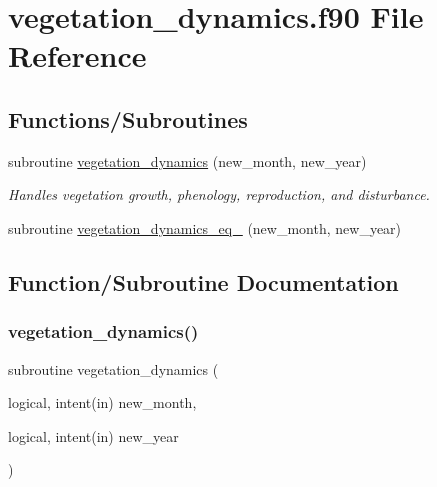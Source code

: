 \hypertarget{vegetation__dynamics_8f90}{}\section{vegetation\+\_\+dynamics.\+f90 File Reference}
\label{vegetation__dynamics_8f90}
\subsection*{Functions/\+Subroutines}
\begin{DoxyCompactItemize}
\item 
subroutine \hyperlink{vegetation__dynamics_8f90_ab9ef01736ecab74cd0da4df6c2b63c0f}{vegetation\+\_\+dynamics} (new\+\_\+month, new\+\_\+year)
\begin{DoxyCompactList}\small\item\em Handles vegetation growth, phenology, reproduction, and disturbance. \end{DoxyCompactList}\item 
subroutine \hyperlink{vegetation__dynamics_8f90_a275be9a740f6c74b8bf5e0a499cb6c49}{vegetation\+\_\+dynamics\+\_\+eq\+\_} (new\+\_\+month, new\+\_\+year)
\end{DoxyCompactItemize}


\subsection{Function/\+Subroutine Documentation}
\mbox{\label{vegetation__dynamics_8f90_ab9ef01736ecab74cd0da4df6c2b63c0f}} 
\subsubsection{\texorpdfstring{vegetation\+\_\+dynamics()}{vegetation\_dynamics()}}
{\footnotesize\ttfamily subroutine vegetation\+\_\+dynamics (\begin{DoxyParamCaption}\item[{logical, intent(in)}]{new\+\_\+month,  }\item[{logical, intent(in)}]{new\+\_\+year }\end{DoxyParamCaption})}



